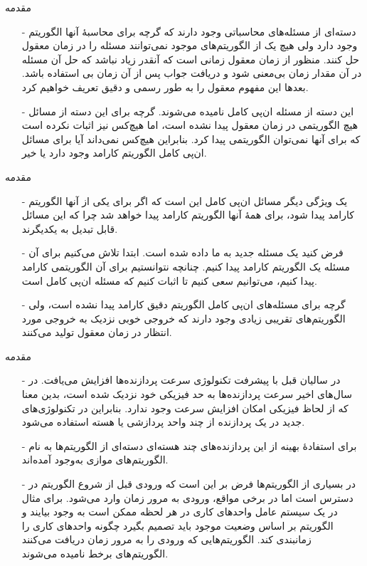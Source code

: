 \begin{frame}{مقدمه}
\begin{itemize}\itemr
\item[-]
دسته‌ای از مسئله‌های محاسباتی وجود دارند که گرچه برای محاسبهٔ آنها الگوریتم وجود دارد ولی هیچ یک از الگوریتم‌های موجود نمی‌توانند مسئله را در زمان معقول حل کنند. منظور از زمان معقول زمانی است که آنقدر زیاد نباشد که حل آن مسئله در آن مقدار زمان بی‌معنی شود و دریافت جواب پس از آن زمان بی استفاده باشد. بعدها این مفهوم معقول را به طور رسمی و دقیق تعریف خواهیم کرد.
\item[-]
این دسته از مسئله ان‌پی کامل نامیده می‌شوند. گرچه برای این دسته از مسائل هیچ الگوریتمی در زمان معقول پیدا نشده است، اما هیچ‌کس نیز اثبات نکرده است که برای آنها نمی‌توان الگوریتمی پیدا کرد. بنابراین هیچ‌کس نمی‌داند آیا برای مسائل ان‌پی کامل الگوریتم کارامد وجود دارد یا خیر.
\end{itemize}
\end{frame}

\begin{frame}{مقدمه}
\begin{itemize}\itemr
\item[-]
یک ویژگی دیگر مسائل ان‌پی کامل این است که اگر برای یکی از آنها الگوریتم کارامد پیدا شود، برای همهٔ آنها الگوریتم کارامد پیدا خواهد شد چرا که این مسائل قابل تبدیل به یکدیگرند.
\item[-]
فرض کنید یک مسئله جدید به ما داده شده است. ابتدا تلاش می‌کنیم برای آن مسئله یک الگوریتم کارامد پیدا کنیم. چنانچه نتوانستیم برای آن الگوریتمی کارامد پیدا کنیم، می‌توانیم سعی کنیم تا اثبات کنیم که مسئله ان‌پی کامل است.
\item[-]
گرچه برای مسئله‌های ان‌پی کامل الگوریتم دقیق کارامد پیدا نشده است، ولی الگوریتم‌های تقریبی زیادی وجود دارند که خروجی خوبی نزدیک به خروجی مورد انتظار در زمان معقول تولید می‌کنند.
\end{itemize}
\end{frame}


\begin{frame}{مقدمه}
\begin{itemize}\itemr
\item[-]
در سالیان قبل با پیشرفت تکنولوژی سرعت پردازنده‌ها افزایش می‌یافت. در سال‌های اخیر سرعت پردازنده‌ها به حد فیزیکی خود نزدیک شده است، بدین معنا که از لحاظ فیزیکی امکان افزایش سرعت وجود ندارد. بنابراین در تکنولوژی‌های جدید در یک پردازنده از چند واحد پردازشی یا هسته استفاده می‌شود.
\item[-]
برای استفادهٔ بهینه از این پردازنده‌های چند هسته‌ای دسته‌ای از الگوریتم‌ها به نام الگوریتم‌های موازی به‌وجود آمده‌اند.
\item[-]
در بسیاری از الگوریتم‌ها فرض بر این است که ورودی قبل از شروع الگوریتم در دسترس است اما در برخی مواقع، ورودی به مرور زمان وارد می‌شود. برای مثال در یک سیستم عامل واحدهای کاری در هر لحظه ممکن است به وجود بیایند و الگوریتم بر اساس وضعیت موجود باید تصمیم بگیرد چگونه واحدهای کاری را زمانبندی کند. الگوریتم‌هایی که ورودی را به مرور زمان دریافت می‌کنند الگوریتم‌های برخط
نامیده می‌شوند.
\end{itemize}
\end{frame}



